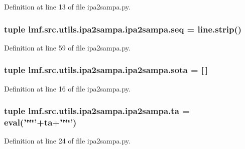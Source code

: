 Definition at line 13 of file ipa2sampa.\+py.

\hypertarget{namespacelmf_1_1src_1_1utils_1_1ipa2sampa_1_1ipa2sampa_a2bff6b612a31a796771c153db6ee739b}{
\subsubsection[{seq}]{\setlength{\rightskip}{0pt plus 5cm}tuple lmf.\+src.\+utils.\+ipa2sampa.\+ipa2sampa.\+seq = line.\+strip()}}\label{namespacelmf_1_1src_1_1utils_1_1ipa2sampa_1_1ipa2sampa_a2bff6b612a31a796771c153db6ee739b}


Definition at line 59 of file ipa2sampa.\+py.

\hypertarget{namespacelmf_1_1src_1_1utils_1_1ipa2sampa_1_1ipa2sampa_aafe2729198b6e17baf543acf1cde5a2c}{
\subsubsection[{sota}]{\setlength{\rightskip}{0pt plus 5cm}tuple lmf.\+src.\+utils.\+ipa2sampa.\+ipa2sampa.\+sota = \mbox{[}$\,$\mbox{]}}}\label{namespacelmf_1_1src_1_1utils_1_1ipa2sampa_1_1ipa2sampa_aafe2729198b6e17baf543acf1cde5a2c}


Definition at line 16 of file ipa2sampa.\+py.

\hypertarget{namespacelmf_1_1src_1_1utils_1_1ipa2sampa_1_1ipa2sampa_a2fad537cd70d78b8061780b2a2a8d986}{
\subsubsection[{ta}]{\setlength{\rightskip}{0pt plus 5cm}tuple lmf.\+src.\+utils.\+ipa2sampa.\+ipa2sampa.\+ta = eval('\char`\"{}\char`\"{}\char`\"{}'+ta+'\char`\"{}\char`\"{}\char`\"{}')}}\label{namespacelmf_1_1src_1_1utils_1_1ipa2sampa_1_1ipa2sampa_a2fad537cd70d78b8061780b2a2a8d986}


Definition at line 24 of file ipa2sampa.\+py.

